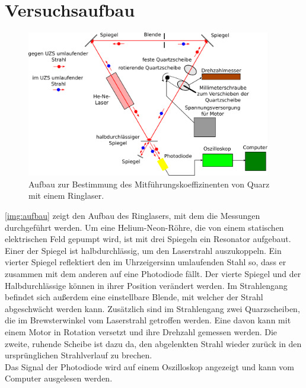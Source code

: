 \section{Versuchsaufbau}
\label{sec:aufbau}

\begin{figure}[H]
\begin{center}
  \includegraphics[width=0.95\textwidth]{../img/aufbau.pdf}
  \caption{Aufbau zur Bestimmung des Mitführungskoeffizinenten von Quarz mit einem Ringlaser.}
  \label{img:aufbau}
\end{center}
\end{figure}
\autoref{img:aufbau} zeigt den Aufbau des Ringlasers,
mit dem die Messungen durchgeführt werden.
Um eine Helium-Neon-Röhre,
die von einem statischen elektrischen Feld gepumpt wird,
ist mit drei Spiegeln ein Resonator aufgebaut.
Einer der Spiegel ist halbdurchlässig, um den Laserstrahl auszukoppeln.
Ein vierter Spiegel reflektiert den im Uhrzeigersinn umlaufenden Stahl so,
dass er zusammen mit dem anderen auf eine Photodiode fällt.
Der vierte Spiegel und der Halbdurchlässige können in ihrer Position verändert werden.
Im Strahlengang befindet sich außerdem eine einstellbare Blende,
mit welcher der Strahl abgeschwächt werden kann.
Zusätzlich sind im Strahlengang zwei Quarzscheiben,
die im Brewsterwinkel vom Laserstrahl getroffen werden.
Eine davon kann mit einem Motor in Rotation versetzt und ihre Drehzahl gemessen werden.
Die zweite, ruhende Scheibe ist dazu da,
den abgelenkten Strahl wieder zurück in den ursprünglichen Strahlverlauf zu brechen.\\
Das Signal der Photodiode wird auf einem Oszilloskop angezeigt und kann
vom Computer ausgelesen werden.
